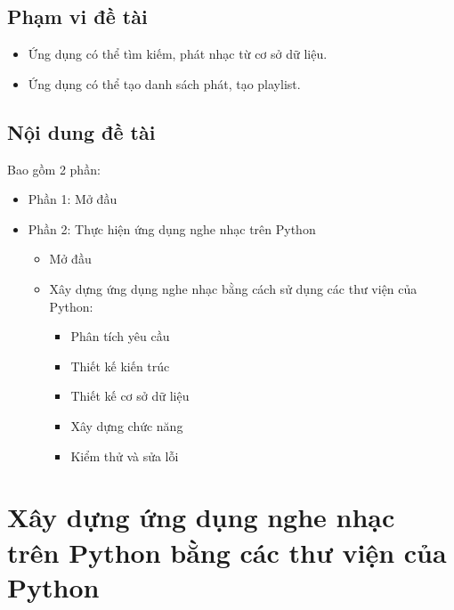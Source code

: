 \documentclass[a4paper]{article}
\begin{document}
\subsection{Phạm vi đề tài}
\begin{itemize}
	\item Ứng dụng có thể tìm kiếm, phát nhạc từ cơ sở dữ liệu.
	\item Ứng dụng có thể tạo danh sách phát, tạo playlist.
\end{itemize}
\subsection{Nội dung đề tài}
\begin{flushleft}
	Bao gồm 2 phần:
	\begin{itemize}
		\item Phần 1: Mở đầu
		\item Phần 2: Thực hiện ứng dụng nghe nhạc trên Python
		      \begin{itemize}
			      \item Mở đầu
			      \item Xây dựng ứng dụng nghe nhạc bằng cách sử dụng các thư viện của Python:
			            \begin{itemize}
				            \item Phân tích yêu cầu
				            \item Thiết kế kiến trúc
				            \item Thiết kế cơ sở dữ liệu
				            \item Xây dựng chức năng
				            \item Kiểm thử và sửa lỗi
			            \end{itemize}
		      \end{itemize}
	\end{itemize}
\end{flushleft}

\section{Xây dựng ứng dụng nghe nhạc trên Python bằng các thư viện của Python}
\end{document}
